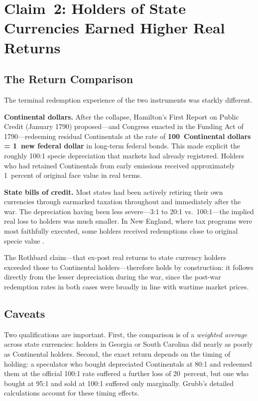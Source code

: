 \documentclass[12pt]{article}
\begin{document}
\section{Claim~2: Holders of State Currencies Earned Higher Real Returns}

\subsection{The Return Comparison}

The terminal redemption experience of the two instruments was starkly
different.

\textbf{Continental dollars.}  After the collapse, Hamilton's First Report on
Public Credit (January 1790) proposed---and Congress enacted in the Funding
Act of 1790---redeeming residual Continentals at the rate of
\textbf{100~Continental dollars = 1~new federal dollar} in long-term federal
bonds.  This made explicit the roughly 100:1 specie depreciation that markets
had already registered.  Holders who had retained Continentals from early
emissions received approximately 1~percent of original face value in real
terms.

\textbf{State bills of credit.}  Most states had been actively retiring their
own currencies through earmarked taxation throughout and immediately after the
war.  The depreciation having been less severe---3:1 to 20:1 vs.\ 100:1---the
implied real loss to holders was much smaller.  In New England, where tax
programs were most faithfully executed, some holders received redemptions close
to original specie value \citep{Grubb2012}.

The Rothbard claim---that ex-post real returns to state currency holders
exceeded those to Continental holders---therefore holds by construction: it
follows directly from the lesser depreciation during the war, since the
post-war redemption rates in both cases were broadly in line with wartime
market prices.

\subsection{Caveats}

Two qualifications are important.  First, the comparison is of a
\emph{weighted average} across state currencies: holders in Georgia or South
Carolina did nearly as poorly as Continental holders.  Second, the exact
return depends on the timing of holding: a speculator who bought depreciated
Continentals at 80:1 and redeemed them at the official 100:1 rate suffered a
further loss of 20~percent, but one who bought at 95:1 and sold at 100:1
suffered only marginally.  Grubb's detailed calculations account for these
timing effects.
\end{document}
